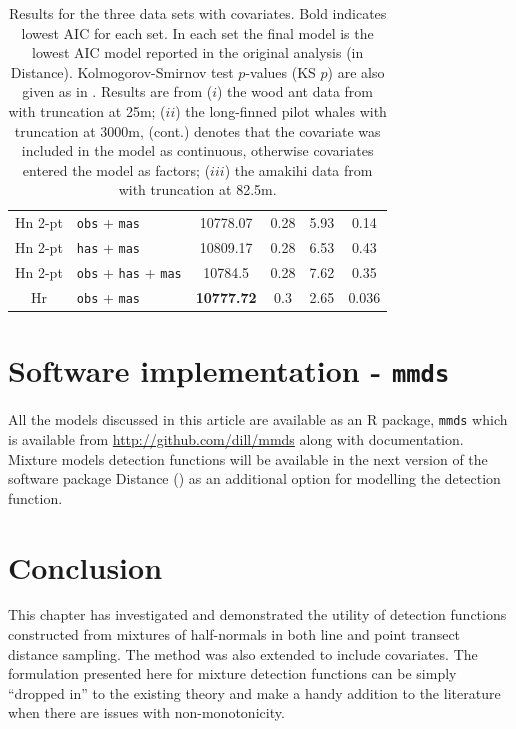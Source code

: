 \begin{table}
\begin{tabular}{c l c c c c}
Hn 2-pt & \texttt{obs} + \texttt{mas} & 10778.07 & 0.28 & 5.93 & 0.14\\
Hn 2-pt & \texttt{has} + \texttt{mas} & 10809.17 & 0.28 & 6.53 & 0.43 \\
Hn 2-pt & \texttt{obs} + \texttt{has} + \texttt{mas} & 10784.5 & 0.28 & 7.62 & 0.35\\
Hr & \texttt{obs} + \texttt{mas} & \textbf{10777.72} & 0.3 & 2.65 & 0.036 \\
\end{tabular}
\caption{Results for the three data sets with covariates. Bold indicates lowest AIC for each set. In each set the final model is the lowest AIC model reported in the original analysis (in Distance). Kolmogorov-Smirnov test $p$-values (KS $p$) are also given as in . Results are from ($i$) the wood ant data from  with truncation at 25m; ($ii$) the long-finned pilot whales  with truncation at 3000m, (cont.) denotes that the covariate was included in the model as continuous, otherwise covariates entered the model as factors; ($iii$) the amakihi data from  with truncation at 82.5m.}
\label{big-results-table}
\end{table}


\section{Software implementation - \texttt{mmds}}

All the models discussed in this article are available as an \textsf{R} package, \texttt{mmds} which is available from \url{http://github.com/dill/mmds} along with documentation. Mixture models detection functions will be available in the next version of the software package Distance (\cite{distance-software}) as an additional option for modelling the detection function.

\section{Conclusion}
\label{s:discuss}

This chapter has investigated and demonstrated the utility of detection functions constructed from mixtures of half-normals in both line and point transect distance sampling. The method was also extended to include covariates. The formulation presented here for mixture detection functions can be simply ``dropped in'' to the existing theory and make a handy addition to the literature when there are issues with non-monotonicity.

